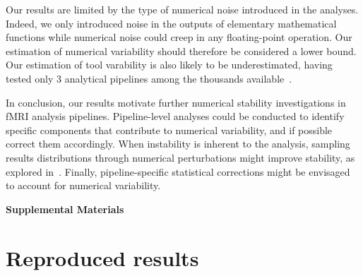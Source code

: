 \documentclass[11pt,onecolumn]{article}
\begin{document}
Our results are limited by the type of numerical noise introduced in the
analyses. Indeed, we only introduced noise in the outputs of elementary
mathematical functions while numerical noise could creep in any
floating-point operation. Our estimation of numerical variability should
therefore be considered a lower bound. Our estimation of tool varability is
also likely to be underestimated, having tested only 3 analytical pipelines
among the thousands available~\cite{carp2012plurality}.

In conclusion, our results motivate further numerical stability
investigations in fMRI analysis pipelines. Pipeline-level analyses could be
conducted to identify specific components that contribute to numerical
variability, and if possible correct them accordingly. When instability is
inherent to the analysis, sampling results distributions through numerical
perturbations might improve stability, as explored in~\cite{kiar2021data}.
Finally, pipeline-specific statistical corrections might be envisaged to
account for numerical variability.




\clearpage

\setcounter{equation}{0}
\setcounter{figure}{0}
\setcounter{table}{0}
\setcounter{section}{0}

\makeatletter
\renewcommand{\theequation}{S\arabic{equation}}
\renewcommand{\thefigure}{S\arabic{figure}}
\renewcommand{\thesection}{S\arabic{section}}

\textbf{\centering \Large Supplemental Materials}

\section{Reproduced results}
\label{sec:supp-repro}
\end{document}

